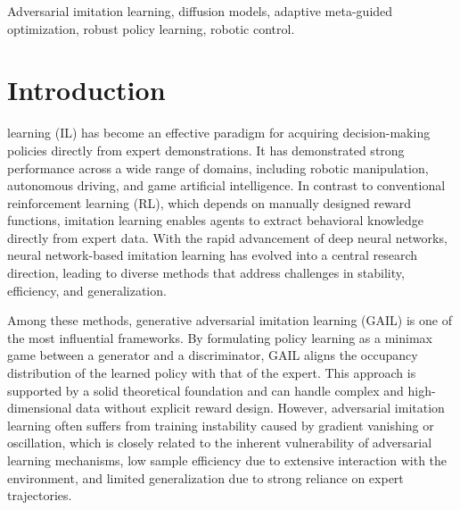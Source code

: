 \documentclass[journal]{IEEEtran}
\begin{document}
\begin{IEEEkeywords}
Adversarial imitation learning, diffusion models, adaptive meta-guided optimization, robust policy learning, robotic control.
\end{IEEEkeywords}



\section{Introduction}
 learning (IL) has become an effective paradigm for acquiring decision-making policies directly from expert demonstrations\cite{hussein2017imitation,zheng2022imitation}. It has demonstrated strong performance across a wide range of domains, including robotic manipulation, autonomous driving, and game artificial intelligence\cite{wan2024lotus,le2022survey,codevilla2018end,silver2016mastering,9904958}. In contrast to conventional reinforcement learning (RL), which depends on manually designed reward functions, imitation learning enables agents to extract behavioral knowledge directly from expert data. With the rapid advancement of deep neural networks, neural network-based imitation learning has evolved into a central research direction, leading to diverse methods that address challenges in stability, efficiency, and generalization\cite{10078377}.

Among these methods, generative adversarial imitation learning (GAIL)\cite{ho2016generative} is one of the most influential frameworks. By formulating policy learning as a minimax game between a generator and a discriminator, GAIL aligns the occupancy distribution of the learned policy with that of the expert. This approach is supported by a solid theoretical foundation and can handle complex and high-dimensional data without explicit reward design. However, adversarial imitation learning often suffers from training instability caused by gradient vanishing or oscillation\cite{arjovsky2017towards}, which is closely related to the inherent vulnerability of adversarial learning mechanisms\cite{yuan2019adversarial}, low sample efficiency due to extensive interaction with the environment, and limited generalization due to strong reliance on expert trajectories.
\end{document}
